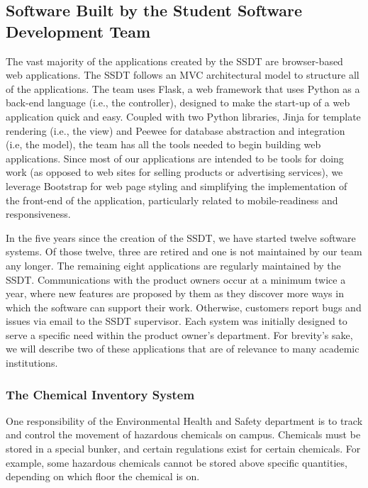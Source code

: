 
\subsection{Software Built by the Student Software Development Team}
The vast majority of the applications created by the SSDT are browser-based web applications. The SSDT follows an MVC architectural model to structure all of the applications. The team uses Flask, a web framework that uses Python as a back-end language (i.e., the controller), designed to make the start-up of a web application quick and easy. Coupled with two Python libraries, Jinja for template rendering (i.e., the view) and Peewee for database abstraction and integration (i.e, the model), the team has all the tools needed to begin building web applications. Since most of our applications are intended to be tools for doing work (as opposed to web sites for selling products or advertising services), we leverage Bootstrap for web page styling and simplifying the implementation of the front-end of the application, particularly related to mobile-readiness and responsiveness.

In the five years since the creation of the SSDT, we have started twelve software systems. Of those twelve, three are retired and one is not maintained by our team any longer. The remaining eight applications are regularly maintained by the SSDT. Communications with the product owners occur at a minimum twice a year, where new features are proposed by them as they discover more ways in which the software can support their work. Otherwise, customers report bugs and issues via email to the SSDT supervisor. Each system was initially designed to serve a specific need within the product owner's department. For brevity's sake, we will describe two of these applications that are of relevance to many academic institutions.


\subsubsection{The Chemical Inventory System} %
One responsibility of the Environmental Health and Safety department is to track and control the movement of hazardous chemicals on campus. Chemicals must be stored in a special bunker, and certain regulations exist for certain chemicals. For example, some hazardous chemicals cannot be stored above specific quantities, depending on which floor the chemical is on.

